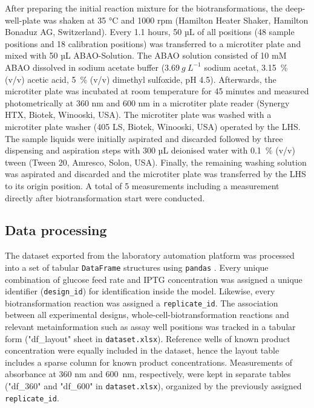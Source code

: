 \documentclass[sn-standardnature]{sn-jnl}%
\theoremstyle{thmstyleone}%
\theoremstyle{thmstyletwo}%
\theoremstyle{thmstylethree}%
\begin{document}
After preparing the initial reaction mixture for the biotransformations, the deep-well-plate was shaken at 35 °C and 1000 rpm (Hamilton Heater Shaker, Hamilton Bonaduz AG, Switzerland).
Every 1.1 hours, 50 µL of all positions (48 sample positions and 18 calibration positions) was transferred to a microtiter plate and mixed with 50 µL ABAO-Solution.
The ABAO solution consisted of 10 mM ABAO dissolved in sodium acetate buffer ($3.69\ g\ L^{-1}$ sodium acetat, 3.15~\% (v/v) acetic acid, 5~\% (v/v) dimethyl sulfoxide, pH 4.5).
Afterwards, the microtiter plate was incubated at room temperature for 45 minutes and measured photometrically at 360 nm and 600 nm in a microtiter plate reader (Synergy HTX, Biotek, Winooski, USA).
The microtiter plate was washed with a microtiter plate washer (405 LS, Biotek, Winooski, USA) operated by the LHS.
The sample liquids were initially aspirated and discarded followed by three dispensing and aspiration steps with 300 µL deionised water with 0.1~\% (v/v) tween (Tween 20, Amresco, Solon, USA).
Finally, the remaining washing solution was aspirated and discarded and the microtiter plate was transferred by the LHS to its origin position.
A total of 5 measurements including a measurement directly after biotransformation start were conducted.

\subsection{Data processing}
\label{sec_mm_computational}

The dataset exported from the laboratory automation platform was processed into a set of tabular \texttt{DataFrame} structures using \texttt{pandas} \cite{pandasSoftware,pandasPaper}.
Every unique combination of glucose feed rate and IPTG concentration was assigned a unique identifier (\texttt{design\_id}) for identification inside the model.
Likewise, every biotransformation reaction was assigned a \texttt{replicate\_id}.
The association between all experimental designs, whole-cell-biotransformation reactions and relevant metainformation such as assay well positions was tracked in a tabular form ("df\_layout" sheet in \texttt{dataset.xlsx}).
Reference wells of known product concentration were equally included in the dataset, hence the layout table includes a sparse column for known product concentrations.
Measurements of absorbance at 360 nm and 600~nm, respectively, were kept in separate tables ("df\_360" and "df\_600" in \texttt{dataset.xlsx}), organized by the previously assigned \texttt{replicate\_id}.
\end{document}
